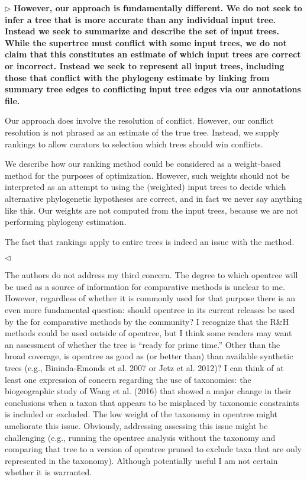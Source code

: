 \documentclass{article}
\newenvironment{reply}{$\triangleright$\bf}{$\triangleleft$}
\begin{document}
\begin{reply}
However, our approach is fundamentally different.  We do not seek to infer a tree that is more accurate than any individual input tree.  Instead we seek to summarize and describe the set of input trees.  While the supertree must conflict with some input trees, we do not claim that this constitutes an estimate of which input trees are correct or incorrect.  Instead we seek to represent all input trees, including those that conflict with the phylogeny estimate by linking from summary tree edges to conflicting input tree edges via our annotations file.

Our approach does involve the resolution of conflict.  However, our conflict resolution is not phrased as an estimate of the true tree.  Instead, we supply rankings to allow curators to selection which trees should win conflicts.

We describe how our ranking method could be considered as a weight-based method for the purposes of optimization.  However, such weights should not be interpreted as an attempt to using the (weighted) input trees to decide which alternative phylogenetic hypotheses are correct, and in fact we never say anything like this. Our weights are not computed from the input trees, because we are not performing phylogeny estimation.  

The fact that rankings apply to entire trees is indeed an issue with the method.


\end{reply}

The authors do not address my third concern. The degree to which opentree will be used as a source of information for comparative methods is unclear to me. However, regardless of whether it is commonly used for that purpose there is an even more fundamental question: should opentree in its current releases be used by the for comparative methods by the community? I recognize that the R\&H methods could be used outside of opentree, but I think some readers may want an assessment of whether the tree is “ready for prime time.” Other than the broad coverage, is opentree as good as (or better than) than available synthetic trees (e.g., Bininda-Emonds et al. 2007 or Jetz et al. 2012)? I can think of at least one expression of concern regarding the use of taxonomies: the biogeographic study of Wang et al. (2016) that showed a major change in their conclusions when a taxon that appears to be misplaced by taxonomic constraints is included or excluded. The low weight of the taxonomy in opentree might ameliorate this issue. Obviously, addressing assessing this issue might be challenging (e.g., running the opentree analysis without the taxonomy and comparing that tree to a version of opentree pruned to exclude taxa that are only represented in the taxonomy). Although potentially useful I am not certain whether it is warranted.
\end{document}
